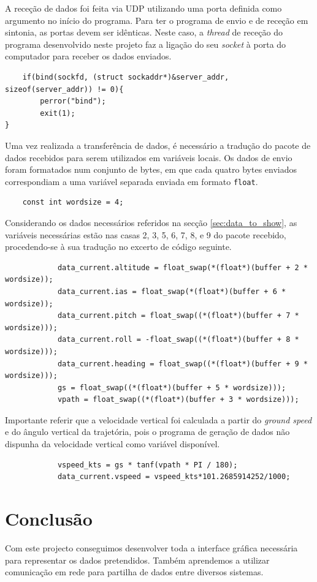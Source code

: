 \documentclass[palatino]{ist-report}
\begin{document}
A receção de dados foi feita via UDP utilizando uma porta definida como argumento no início do programa. Para ter o programa de envio e de receção em sintonia, as portas devem ser idênticas. Neste caso, a \textit{thread} de receção do programa desenvolvido neste projeto faz a ligação do seu \textit{socket} à porta do computador para receber os dados enviados.
\begin{verbatim}
    if(bind(sockfd, (struct sockaddr*)&server_addr, sizeof(server_addr)) != 0){
        perror("bind");
        exit(1);
}
\end{verbatim}

Uma vez realizada a transferência de dados, é necessário a tradução do pacote de dados recebidos para serem utilizados em variáveis locais. Os dados de envio foram formatados num conjunto de bytes, em que cada quatro bytes enviados correspondiam a uma variável separada enviada em formato \texttt{float}.
\begin{verbatim}
    const int wordsize = 4;
\end{verbatim}

Considerando os dados necessários referidos na secção \ref{sec:data_to_show}, as variáveis necessárias estão nas casas 2, 3, 5, 6, 7, 8, e 9 do pacote recebido, procedendo-se à sua tradução no excerto de código seguinte.
\begin{verbatim}
            data_current.altitude = float_swap(*(float*)(buffer + 2 * wordsize));
            data_current.ias = float_swap(*(float*)(buffer + 6 * wordsize));
            data_current.pitch = float_swap((*(float*)(buffer + 7 * wordsize)));
            data_current.roll = -float_swap((*(float*)(buffer + 8 * wordsize)));
            data_current.heading = float_swap((*(float*)(buffer + 9 * wordsize)));
            gs = float_swap((*(float*)(buffer + 5 * wordsize)));
            vpath = float_swap((*(float*)(buffer + 3 * wordsize)));
\end{verbatim}

Importante referir que a velocidade vertical foi calculada a partir do \textit{ground speed} e do ângulo vertical da trajetória, pois o programa de geração de dados não dispunha da velocidade vertical como variável disponível.
\begin{verbatim}
            vspeed_kts = gs * tanf(vpath * PI / 180);
            data_current.vspeed = vspeed_kts*101.2685914252/1000;
\end{verbatim}

\section{Conclusão}

Com este projecto conseguimos desenvolver toda a interface gráfica necessária para representar os dados pretendidos. Também aprendemos a utilizar comunicação em rede para partilha de dados entre diversos sistemas.

\appendix
\end{document}
